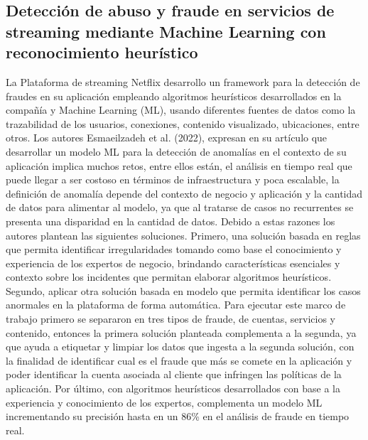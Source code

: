 \documentclass[9pt,a4paper,twoside]{rho-class/rho}
\begin{document}
        \subsection{Detección de abuso y fraude en servicios de streaming mediante Machine Learning con reconocimiento heurístico}
        La Plataforma de streaming Netflix desarrollo un framework para la detección de fraudes en su aplicación empleando algoritmos heurísticos desarrollados en la compañía y Machine Learning (ML), usando diferentes fuentes de datos como la trazabilidad de los usuarios, conexiones, contenido visualizado, ubicaciones, entre otros. Los autores Esmaeilzadeh et al. (2022), expresan en su artículo que desarrollar un modelo ML para la detección de anomalías en el contexto de su aplicación implica muchos retos, entre ellos están, el análisis en tiempo real que puede llegar a ser costoso en términos de infraestructura y poca escalable, la definición de anomalía depende del contexto de negocio y aplicación y la cantidad de datos para alimentar al modelo, ya que al tratarse de casos no recurrentes se presenta una disparidad en la cantidad de datos. Debido a estas razones los autores plantean las siguientes soluciones. Primero, una solución basada en reglas que permita identificar irregularidades tomando como base el conocimiento y experiencia de los expertos de negocio, brindando características esenciales y contexto sobre los incidentes que permitan elaborar algoritmos heurísticos. Segundo, aplicar otra solución basada en modelo que permita identificar los casos anormales en la plataforma de forma automática. Para ejecutar este marco de trabajo primero se separaron en tres tipos de fraude, de cuentas, servicios y contenido, entonces la primera solución planteada complementa a la segunda, ya que ayuda a etiquetar y limpiar los datos que ingesta a la segunda solución, con la finalidad de identificar cual es el fraude que más se comete en la aplicación y poder identificar la cuenta asociada al cliente que infringen las políticas de la aplicación. Por último, con algoritmos heurísticos desarrollados con base a la experiencia y conocimiento de los expertos, complementa un modelo ML incrementando su precisión hasta en un 86\% en el análisis de fraude en tiempo real.
\end{document}
